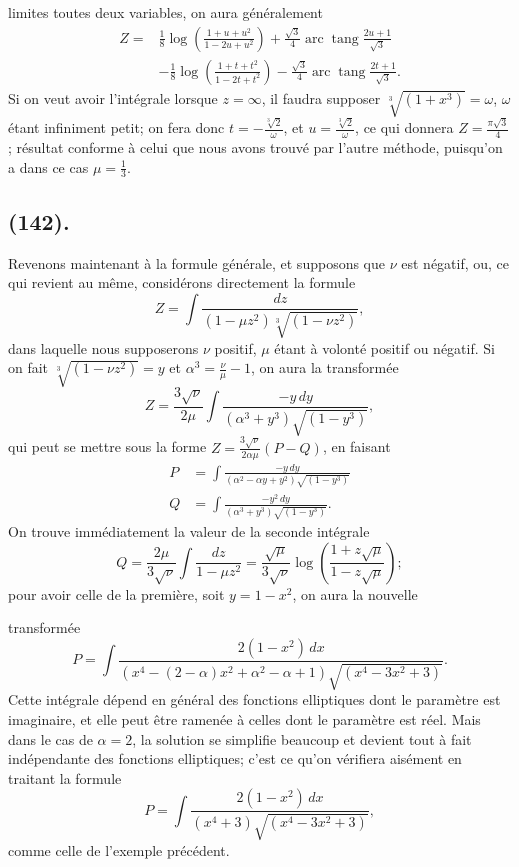 \documentclass{article}
\begin{document}
limites toutes deux variables, on aura généralement
\[ \begin{aligned} Z={}&\tfrac{1}{8}\log\left(\frac{1+u+u^{2}}{1-2u+u^{2}}\right)+\frac{\sqrt{3}}{4}\operatorname{arc}\operatorname{tang}\frac{2u+1}{\sqrt{3}}\\ &-\tfrac{1}{8}\log\left(\frac{1+t+t^{2}}{1-2t+t^{2}}\right)-\frac{\sqrt{3}}{4}\operatorname{arc}\operatorname{tang}\frac{2t+1}{\sqrt{3}}. \end{aligned} \]
Si on veut avoir l'intégrale lorsque $z=\infty$, il faudra supposer $\sqrt[3]{(1+x^{3})}=\omega$, $\omega$ étant infiniment petit; on fera donc $t=-\frac{\sqrt[3]{2}}{\omega}$, et $u=\frac{\sqrt[3]{2}}{\omega}$, ce qui donnera $Z=\frac{\pi\sqrt{3}}{4}$; résultat conforme à celui que nous avons trouvé par l'autre méthode, puisqu'on a dans ce cas $\mu=\frac{1}{3}$.

\subsection*{(142).}

Revenons maintenant à la formule générale, et supposons que $\nu$ est négatif, ou, ce qui revient au même, considérons directement la formule
\[ Z=\int\frac{dz}{(1-\mu z^{2})\sqrt[3]{(1-\nu z^{2})}}, \]
dans laquelle nous supposerons $\nu$ positif, $\mu$ étant à volonté positif ou négatif. Si on fait $\sqrt[3]{(1-\nu z^{2})}=y$ et $\alpha^{3}=\frac{\nu}{\mu}-1$, on aura la transformée
\[ Z=\frac{3\sqrt{\nu}}{2\mu}\int\frac{-y\,dy}{(\alpha^{3}+y^{3})\sqrt{(1-y^{3})}}, \]
qui peut se mettre sous la forme $Z=\frac{3\sqrt{\nu}}{2\alpha\mu}(P-Q)$, en faisant
\[ \begin{aligned} P&=\int\frac{-y\,dy}{(\alpha^{2}-\alpha y+y^{2})\sqrt{(1-y^{3})}}\\ Q&=\int\frac{-y^{2}\,dy}{(\alpha^{3}+y^{3})\sqrt{(1-y^{3})}}. \end{aligned} \]
On trouve immédiatement la valeur de la seconde intégrale
\[ Q=\frac{2\mu}{3\sqrt{\nu}}\int\frac{dz}{1-\mu z^{2}}=\frac{\sqrt{\mu}}{3\sqrt{\nu}}\log\left(\frac{1+z\sqrt{\mu}}{1-z\sqrt{\mu}}\right); \]
pour avoir celle de la première, soit $y=1-x^{2}$, on aura la nouvelle

transformée
\[ P=\int\frac{2(1-x^{2})\,dx}{(x^{4}-(2-\alpha)x^{2}+\alpha^{2}-\alpha+1)\sqrt{(x^{4}-3x^{2}+3)}}. \]
Cette intégrale dépend en général des fonctions elliptiques dont le paramètre est imaginaire, et elle peut être ramenée à celles dont le paramètre est réel. Mais dans le cas de $\alpha=2$, la solution se simplifie beaucoup et devient tout à fait indépendante des fonctions elliptiques; c'est ce qu'on vérifiera aisément en traitant la formule
\[ P=\int\frac{2(1-x^{2})\,dx}{(x^{4}+3)\sqrt{(x^{4}-3x^{2}+3)}}, \]
comme celle de l'exemple précédent.
\end{document}
